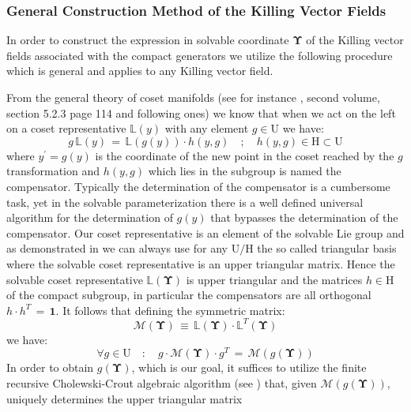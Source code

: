 \documentclass[10pt,a4paper]{article}
\begin{document}
\subsubsection{General Construction Method of the Killing Vector Fields}
\label{generalecuster}
In order to construct the expression in solvable coordinate $\boldsymbol{\Upsilon}$ of the Killing vector fields associated with the compact generators we utilize the following procedure which is general and applies to any
Killing vector field.
\par
From the general theory of coset manifolds (see for instance \cite{pietrobook}, second volume, section 5.2.3 page 114 and following ones) we know that when we act on the left on a coset representative $\mathbb{L}(y)$ with any element $g\in \mathrm{U}$ we have:
\begin{equation}\label{barengo}
  g\, \mathbb{L}(y)\, = \, \mathbb{L}\left(g\left(y\right)\right)\cdot h(y,g) \quad ; \quad h(y,g)\in \mathrm{H} \subset \mathrm{U}
\end{equation}
where $y^\prime=g(y)$ is the coordinate of the new point in the coset reached by the $g$ transformation and
$h(y,g)$ which lies in the subgroup is named the compensator. Typically the determination of the compensator is a cumbersome task, yet in the solvable parameterization there is a well defined universal algorithm for the determination of $g(y)$ that bypasses  the determination of the compensator. Our coset representative is
an element of the solvable Lie group and as demonstrated in \cite{pgtstheory,TSnaviga} we can always use for any
$\mathrm{U/H}$ the so called triangular basis where the solvable coset representative is an upper triangular matrix.
Hence the solvable coset representative $\mathbb{L}(\boldsymbol{\Upsilon})$ is upper triangular and the matrices $h\in \mathrm{H}$ of the compact subgroup, in particular the compensators are all orthogonal $h\cdot h^T \, =\, \mathbf{1}$. It follows that defining the symmetric matrix:
\begin{equation}\label{barnabeo}
  \mathcal{M}(\boldsymbol{\Upsilon}) \, \equiv \, \mathbb{L}(\boldsymbol{\Upsilon})\cdot\mathbb{L}^T(\boldsymbol{\Upsilon})
\end{equation}
we have:
\begin{equation}\label{fioridizucca}
  \forall g \in \mathrm{U} \quad : \quad g\cdot \mathcal{M}\left(\boldsymbol{\Upsilon}\right) \cdot g^{T} \, = \,
  \mathcal{M}\left(g\left(\boldsymbol{\Upsilon}\right)\right)
\end{equation}
In order to obtain $g\left(\boldsymbol{\Upsilon}\right)$, which is our goal, it suffices to utilize the finite recursive Cholewski-Crout algebraic algorithm (see \cite{pgtstheory,TSnaviga}) that, given $\mathcal{M}\left(g\left(\boldsymbol{\Upsilon}\right)\right)$, uniquely determines the upper triangular matrix
\end{document}
